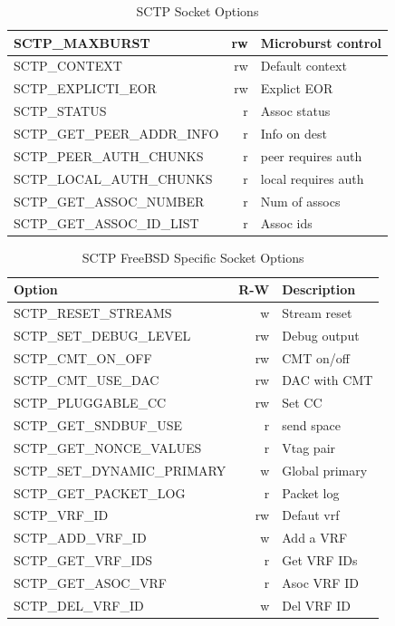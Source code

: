 \documentclass[conference]{IEEEtran}
\begin{document}
\begin{table}
\begin{tabular}{|l|r|l|}
\hline
SCTP\_MAXBURST & rw & Microburst control\\
\hline
SCTP\_CONTEXT & rw & Default context\\
\hline
SCTP\_EXPLICTI\_EOR & rw & Explict EOR\\
\hline
SCTP\_STATUS & r & Assoc status\\
\hline
SCTP\_GET\_PEER\_ADDR\_INFO & r & Info on dest\\
\hline
SCTP\_PEER\_AUTH\_CHUNKS & r & peer requires auth\\
\hline
SCTP\_LOCAL\_AUTH\_CHUNKS & r & local requires auth\\
\hline
SCTP\_GET\_ASSOC\_NUMBER & r & Num of assocs\\
\hline
SCTP\_GET\_ASSOC\_ID\_LIST & r & Assoc ids\\
\hline
\end{tabular}
\caption{SCTP Socket Options\label{sockopt}}
\end{table}

\begin{table}
\begin{tabular}{|l|r|l|}
\hline
Option & R-W & Description\\
\hline \hline
SCTP\_RESET\_STREAMS & w & Stream reset\\
\hline
SCTP\_SET\_DEBUG\_LEVEL & rw & Debug output\\
\hline
SCTP\_CMT\_ON\_OFF & rw & CMT on/off\\
\hline
SCTP\_CMT\_USE\_DAC & rw & DAC with CMT\\
\hline
SCTP\_PLUGGABLE\_CC & rw & Set CC\\
\hline
SCTP\_GET\_SNDBUF\_USE & r &  send space\\
\hline
SCTP\_GET\_NONCE\_VALUES & r & Vtag pair\\
\hline
SCTP\_SET\_DYNAMIC\_PRIMARY & w & Global primary\\
\hline
SCTP\_GET\_PACKET\_LOG & r & Packet log \\
\hline
SCTP\_VRF\_ID & rw & Defaut vrf\\
\hline
SCTP\_ADD\_VRF\_ID & w & Add a VRF\\
\hline
SCTP\_GET\_VRF\_IDS & r & Get VRF IDs\\
\hline
SCTP\_GET\_ASOC\_VRF & r & Asoc VRF ID\\
\hline
SCTP\_DEL\_VRF\_ID & w & Del VRF ID\\
\hline
\end{tabular}
\caption{SCTP FreeBSD Specific Socket Options\label{sockopt}}
\end{table}
\end{document}
